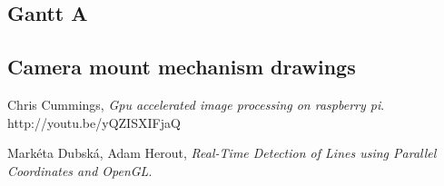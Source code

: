 \documentclass[paper=A4, fontsize=11pt, titlepage]{article}
\numberwithin{equation}{section}
\numberwithin{figure}{section}
\numberwithin{table}{section}
\begin{document}
\subsection{Gantt A}

\subsection{Camera mount mechanism drawings}



\clearpage

\begin{thebibliography}{9}
	Chris Cummings,
	\emph{Gpu accelerated image processing on raspberry pi}. http://youtu.be/yQZISXIFjaQ

	Markéta Dubská, Adam Herout,
	\emph{Real-Time Detection of Lines using Parallel Coordinates and OpenGL}. 

\end{thebibliography}
\end{document}
